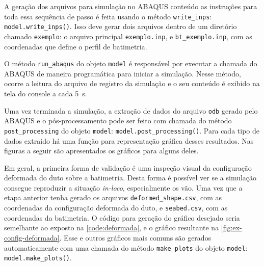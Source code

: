 
A geração dos arquivos para simulação no ABAQUS conteúdo as instruções para toda essa sequência de passo é feita usando o método \texttt{write\_inps}: \texttt{model.write\_inps()}.
Isso deve gerar dois arquivos dentro de um diretório chamado \texttt{exemplo}: o arquivo principal \texttt{exemplo.inp}, e \texttt{bt\_exemplo.inp}, com as coordenadas que define o perfil de batimetria. \par

O método \texttt{run\_abaqus} do objeto \texttt{model} é responsável por executar a chamada do ABAQUS de maneira programática para iniciar a simulação.
Nesse método, ocorre a leitura do arquivo de registro da simulação e o seu conteúdo é exibido na tela do console a cada 5~s.

Uma vez terminada a simulação, a extração de dados do arquivo \texttt{odb} gerado pelo ABAQUS e o pós-processamento pode ser feito com chamada do método \texttt{post\_processing} do objeto \texttt{model}: \texttt{model.post\_processing()}.
Para cada tipo de dados extraído há uma função para representação gráfica desses resultados. Nas figuras a seguir são apresentados os gráficos para alguns deles.

Em geral, a primeira forma de validação é uma inspeção visual da configuração deformada do duto sobre a batimetria. Desta forma é possível ver se a simulação consegue reproduzir a situação \textit{in-loco}, especialmente os vão. Uma vez que a etapa anterior tenha gerado os arquivos \texttt{deformed\_shape.csv}, com as coordenadas da configuração deformada do duto, e \texttt{seabed.csv}, com as coordenadas da batimetria. O código para geração do gráfico desejado seria semelhante ao exposto na \autoref{code:deformada}, e o gráfico resultante na \autoref{fig:ex-config-deformada}. Esse e outros gráficos mais comuns são gerados automaticamente com uma chamada do método \texttt{make\_plots} do objeto \texttt{model}: \texttt{model.make\_plots()}.


